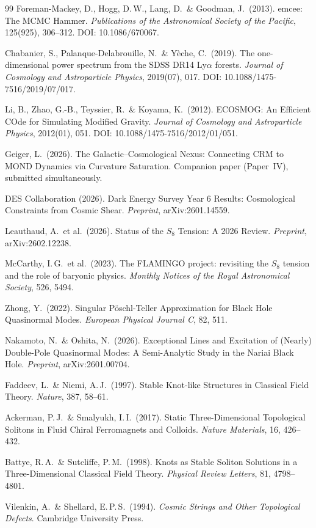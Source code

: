 \documentclass[11pt,a4paper]{article}
\begin{document}
\begin{thebibliography}{99}
Foreman-Mackey, D., Hogg, D.\,W., Lang, D.\ \& Goodman, J.\ (2013).
emcee: The MCMC Hammer.
\textit{Publications of the Astronomical Society of the Pacific}, 125(925), 306--312.
DOI: 10.1086/670067.

Chabanier, S., Palanque-Delabrouille, N.\ \& Y\`eche, C.\ (2019).
The one-dimensional power spectrum from the SDSS DR14 Ly$\alpha$ forests.
\textit{Journal of Cosmology and Astroparticle Physics}, 2019(07), 017.
DOI: 10.1088/1475-7516/2019/07/017.

Li, B., Zhao, G.-B., Teyssier, R.\ \& Koyama, K.\ (2012).
ECOSMOG: An Efficient COde for Simulating Modified Gravity.
\textit{Journal of Cosmology and Astroparticle Physics}, 2012(01), 051.
DOI: 10.1088/1475-7516/2012/01/051.

Geiger, L.\ (2026).
The Galactic--Cosmological Nexus: Connecting CRM to MOND Dynamics via Curvature Saturation.
Companion paper (Paper~IV), submitted simultaneously.

DES Collaboration (2026).
Dark Energy Survey Year 6 Results: Cosmological Constraints from Cosmic Shear.
\textit{Preprint}, arXiv:2601.14559.

Leauthaud, A.\ et al.\ (2026).
Status of the $S_8$ Tension: A 2026 Review.
\textit{Preprint}, arXiv:2602.12238.

McCarthy, I.\,G.\ et al.\ (2023).
The FLAMINGO project: revisiting the $S_8$ tension and the role of baryonic physics.
\textit{Monthly Notices of the Royal Astronomical Society}, 526, 5494.

Zhong, Y.\ (2022).
Singular P\"oschl-Teller Approximation for Black Hole Quasinormal Modes.
\textit{European Physical Journal C}, 82, 511.

Nakamoto, N.\ \& Oshita, N.\ (2026).
Exceptional Lines and Excitation of (Nearly) Double-Pole Quasinormal Modes: A Semi-Analytic Study in the Nariai Black Hole.
\textit{Preprint}, arXiv:2601.00704.

Faddeev, L.\ \& Niemi, A.\,J.\ (1997).
Stable Knot-like Structures in Classical Field Theory.
\textit{Nature}, 387, 58--61.

Ackerman, P.\,J.\ \& Smalyukh, I.\,I.\ (2017).
Static Three-Dimensional Topological Solitons in Fluid Chiral Ferromagnets and Colloids.
\textit{Nature Materials}, 16, 426--432.

Battye, R.\,A.\ \& Sutcliffe, P.\,M.\ (1998).
Knots as Stable Soliton Solutions in a Three-Dimensional Classical Field Theory.
\textit{Physical Review Letters}, 81, 4798--4801.

Vilenkin, A.\ \& Shellard, E.\,P.\,S.\ (1994).
\textit{Cosmic Strings and Other Topological Defects}. Cambridge University Press.

\end{thebibliography}
\end{document}
